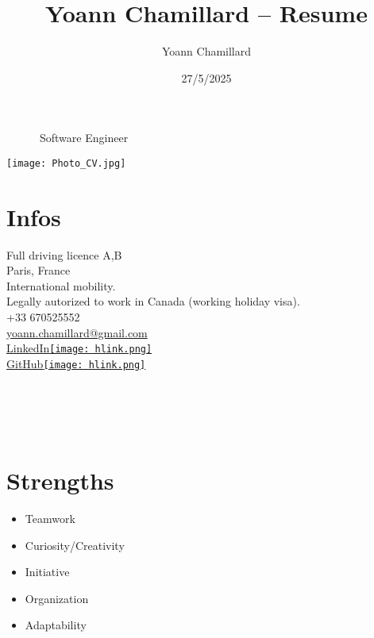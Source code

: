 \documentclass[]{friggeri-cv}
\title{Yoann Chamillard -- Resume}
\author{Yoann Chamillard}
\date{27/5/2025}
\begin{document}
      {~~~~~~Software Engineer}
      {}

\begin{aside}
\hspace{10mm}\texttt{[image: Photo\_CV.jpg]}
\section{Infos}

Full driving licence A,B\\
\vspace{2.5mm}
Paris, France\\
\vspace{1.5mm}
International mobility.\\
\vspace*{0.6mm}Legally autorized to work in Canada (working holiday visa).\\
\vspace{2.5mm}
+33 670525552\\
\href{mailto:yoann.chamillard@gmail.com}{\small yoann.chamillard@gmail.com}\\
\vspace{2.5mm}
\href{https://www.linkedin.com/in/yoannchamillard/?locale=en_US}{LinkedIn\hspace{1.5mm}\texttt{[image: hlink.png]}}\\
\href{https://github.com/Nokheenig?tab=stars}{GitHub\hspace{1.5mm}\texttt{[image: hlink.png]}}\\
\vspace{2.5mm}
\\
\\
\\
\\
\vspace{2.5mm}%

\section{Strengths}
\begin{itemize}
\item Teamwork
\item Curiosity/Creativity
\item Initiative
\item Organization
\item Adaptability
\end{itemize}

\end{aside}
\end{document}
